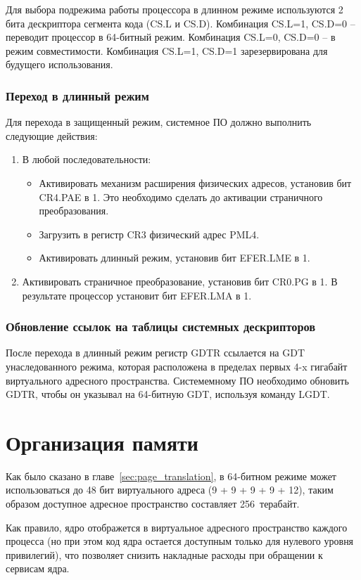 Для выбора подрежима работы процессора в длинном режиме используются 2 бита дескриптора сегмента кода (CS.L и CS.D).
Комбинация CS.L=1, CS.D=0 -- переводит процессор в 64-битный режим. Комбинация CS.L=0, CS.D=0 -- в
режим совместимости. Комбинация CS.L=1, CS.D=1 зарезервирована для будущего использования.

\subsubsection*{Переход в длинный режим}
Для перехода в защищенный режим, системное ПО должно выполнить следующие действия:
\begin{enumerate}[1.]
\item В любой последовательности:
	\begin{itemize}
	\item Активировать механизм расширения физических адресов, установив бит CR4.PAE в 1. Это
		необходимо сделать до активации страничного преобразования.
	\item Загрузить в регистр CR3 физический адрес PML4.
	\item Активировать длинный режим, установив бит EFER.LME в 1.
	\end{itemize}
\item Активировать страничное преобразование, установив бит CR0.PG в 1. В результате процессор установит бит EFER.LMA в 1.
\end{enumerate}

\subsubsection*{Обновление ссылок на таблицы системных дескрипторов}
После перехода в длинный режим регистр GDTR ссылается на GDT унаследованного режима, которая расположена
в пределах первых 4-x гигабайт виртуального адресного пространства. Системемному ПО необходимо обновить GDTR,
чтобы он указывал на 64-битную GDT, используя команду LGDT.


\section{Организация памяти}
Как было сказано в главе~\ref{sec:page_translation}, в 64-битном режиме может использоваться
до 48 бит виртуального адреса (9 + 9 + 9 + 9 + 12), таким образом доступное адресное пространство
составляет 256~терабайт.

Как правило, ядро отображется в виртуальное адресного пространство каждого процесса (но при этом код ядра
остается доступным только для нулевого уровня привилегий), что позволяет снизить накладные расходы при
обращении к сервисам ядра.


